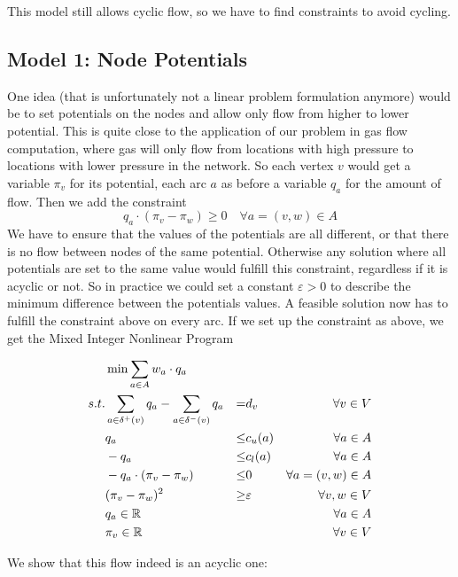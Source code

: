 This model still allows cyclic flow, so we have to find constraints to avoid cycling. 
\subsection{Model 1: Node Potentials}
\label{model:nodePotential}

One idea (that is unfortunately not a linear problem formulation anymore) would be to set potentials on the nodes and 
allow only flow from higher to lower potential. This is quite close to the application of our problem in gas flow 
computation, where gas will only flow from locations with high pressure to locations with lower pressure in the 
network. So 
each vertex $v$ would get a variable $\pi_v$ for its potential, each arc $a$ as before a variable $q_a$ for the amount 
of flow. Then we add the constraint $$q_a\cdot (\pi_v -\pi_w)\ge 0\quad\forall a=(v,w)\in A $$
We have to ensure that the values of the potentials are all 
different, or that there is no flow between nodes of the same potential. Otherwise any solution where all potentials 
are set to the same value would fulfill this constraint, regardless if it is acyclic or not. So in practice we could 
set a constant $\varepsilon > 0$ to describe the minimum difference between the potentials values. A feasible 
solution now has to fulfill the constraint above on every arc. If we set up the constraint as above, we get the Mixed 
Integer Nonlinear Program

\begin{align*}\label{model:nodePotentialQuadratic}
  &\min \sum_{a\in A} w_a\cdot q_a & \\
 s.t. & \sum_{a\in \delta^+(v)}q_a - \sum_{a\in\delta^- (v)}q_a &=& d_v\ &\forall v\in V \\
 & q_a &\le& c_u(a) & \forall a\in A\\
 & -q_a &\le& c_l(a) & \forall a\in A\\
 & -q_a\cdot (\pi_v -\pi_w)&\le& 0 &\forall a=(v,w)\in A\\
 & (\pi_v - \pi_w)^2 &\ge& \varepsilon &\forall v,w \in V\\
 & q_a \in \mathbb{R} & & &\forall a\in A\\
 & \pi_v \in \mathbb{R} & & & \forall v\in V\\
\end{align*}

We show that this flow indeed is an acyclic one:

